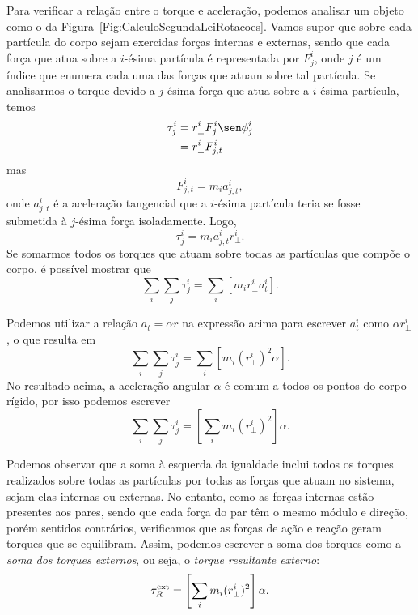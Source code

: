 Para verificar a relação entre o torque e aceleração, podemos analisar um objeto como o da Figura~\ref{Fig:CalculoSegundaLeiRotacoes}. Vamos supor que sobre cada partícula do corpo sejam exercidas forças internas e externas, sendo que cada força que atua sobre a $i$-ésima partícula é representada por $F_j^i$, onde $j$ é um índice que enumera cada uma das forças que atuam sobre tal partícula. Se analisarmos o torque devido a $j$-ésima força que atua sobre a $i$-ésima partícula, temos
\begin{align}
	\tau_j^i &= r_\perp^i F_j^i \sen\phi_j^i \\
	&= r_\perp^i F_{j,t}^i
\end{align}
%
mas
\begin{equation}
	F_{j,t}^{i} = m_i a_{j,t}^{i},
\end{equation}
%
onde $a_{j,t}^i$ é a aceleração  tangencial que a $i$-ésima partícula teria se fosse submetida à $j$-ésima força isoladamente.
%
Logo,
\begin{equation}
	\tau_j^i = m_i a_{j,t}^{i} r_\perp^i.
\end{equation}
%
Se somarmos todos os torques que atuam sobre todas as partículas que compõe o corpo, é possível mostrar que
\begin{equation}
	\sum_i \sum_j \tau_j^i = \sum_{i}[m_i r_\perp^i a_{t}^i].
\end{equation}

Podemos utilizar a relação $a_t = \alpha r$ na expressão acima para escrever $a_{t}^i$ como $\alpha r_\perp^i$, o que resulta em
\begin{equation}
	\sum_i \sum_j \tau_j^i = \sum_{i}[m_i (r_\perp^i)^2 \alpha].
\end{equation}
%
No resultado acima, a aceleração angular $\alpha$ é comum a todos os pontos do corpo rígido, por isso podemos escrever
\begin{equation}
	\sum_i \sum_j \tau_j^i =  \left[\sum_{i} m_i (r_\perp^i)^2\right] \alpha.
\end{equation}

Podemos observar que a soma à esquerda da igualdade inclui todos os torques realizados sobre todas as partículas por todas as forças que atuam no sistema, sejam elas internas ou externas. No entanto, como as forças internas estão presentes aos pares, sendo que cada força do par têm o mesmo módulo e direção, porém sentidos contrários, verificamos que as forças de ação e reação geram torques que se equilibram. Assim, podemos escrever a soma dos torques como a \emph{soma dos torques externos}, ou seja, o \emph{torque resultante externo}:
\begin{equation}\label{Eq:ProtoSegundaLeiRotacoes}
    \tau_R^{\rm{ext}} = \left[\sum_{i} m_i (r_\perp^i)^2\right] \alpha.
\end{equation}
% 

